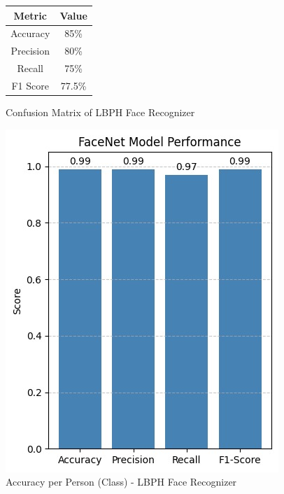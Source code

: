 \documentclass[openany]{report}
\begin{document}
\begin{figure}[H]
    \centering
    \begin{minipage}{0.48\textwidth}
        \centering
        \begin{tabular}{|c|c|}
            \hline
            \textbf{Metric} & \textbf{Value} \\ 
            \hline
            Accuracy        & 85\%           \\ 
            \hline
            Precision       & 80\%           \\ 
            \hline
            Recall          & 75\%           \\ 
            \hline
            F1 Score        & 77.5\%         \\ 
            \hline
        \end{tabular}
        \caption{Confusion Matrix of LBPH Face Recognizer}
        \label{tab:confusion-metrics}
    \end{minipage}
    \hfill
    \begin{minipage}{0.48\textwidth}
        \centering
        \includegraphics[width=\textwidth]{../imgs/model_1_confusion_matrix.jpg}
        \caption{Accuracy per Person (Class) - LBPH Face Recognizer}
        \label{fig:confusion-matrix}
    \end{minipage}
\end{figure}
\end{document}
